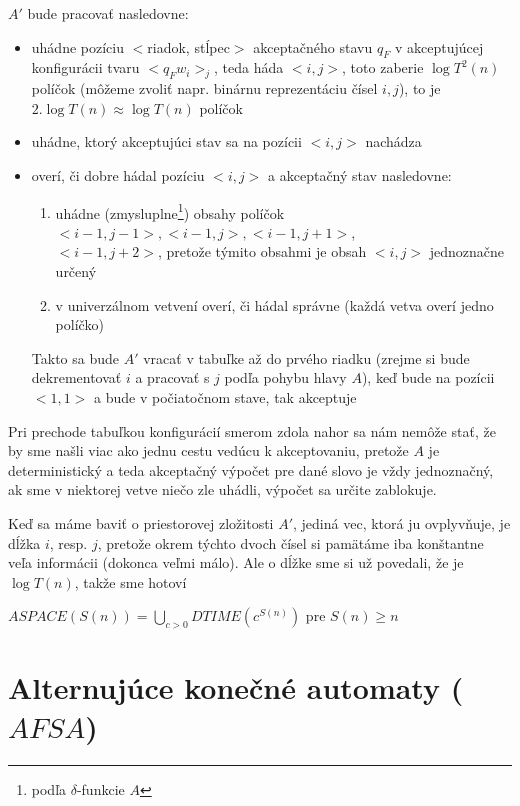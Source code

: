 \begin{dokaz}
  $A'$ bude pracovať nasledovne:
  \begin{itemize}
    \item uhádne pozíciu $<$riadok, stĺpec$>$ akceptačného stavu $q_F$
      v akceptujúcej kon\-fi\-gu\-rá\-cii tvaru \mbox{$<q_Fw_i>_j$},
      teda háda $<i,j>$, toto zaberie $\log T^2(n)$ políčok (môžeme
      zvoliť napr. binárnu reprezentáciu čísel $i,j$), to je $2.\log
      T(n)\approx\log T(n)$ políčok
    \item uhádne, ktorý akceptujúci stav sa na pozícii $<i,j>$
      nachádza
    \item overí, či dobre hádal pozíciu $<i,j>$ a akceptačný stav
      nasledovne:
      \begin{enumerate}
        \item uhádne (zmysluplne\footnote{podľa $\delta$-funkcie $A$})
          obsahy políčok
          \mbox{$<i-1,j-1>,<i-1,j>,<i-1,j+1>$},\\\mbox{$<i-1,j+2>$}, pretože
          týmito obsahmi je obsah $<i,j>$ jednoznačne určený
        \item v univerzálnom vetvení overí, či hádal správne (každá
          vetva overí jedno políčko)
      \end{enumerate}
      Takto sa bude $A'$ vracať v tabuľke až do prvého riadku (zrejme si
      bude dekrementovať $i$ a pracovať s $j$ podľa pohybu hlavy $A$),
      keď bude na pozícii $<1,1>$ a bude v počiatočnom stave, tak
      akceptuje
  \end{itemize}
  Pri prechode tabuľkou konfigurácií smerom zdola nahor sa nám
  nemôže stať, že by sme našli viac ako jednu cestu vedúcu k
  akceptovaniu, pretože $A$ je deterministický a teda akceptačný
  výpočet pre dané slovo je vždy jednoznačný, ak sme v niektorej
  vetve niečo zle uhádli, výpočet sa určite zablokuje.

  \smallskip
  Keď sa máme baviť o priestorovej zložitosti $A'$, jediná vec,
  ktorá ju ovplyvňuje, je dĺžka $i$, resp. $j$, pretože okrem týchto
  dvoch čísel si pamätáme iba konštantne veľa informácii (dokonca
  veľmi málo). Ale o dĺžke sme si už povedali, že je $\log T(n)$,
  takže sme hotoví
\end{dokaz}

\begin{dosledok}
  $ASPACE(S(n))=\underset{{c>0}}{\bigcup}DTIME(c^{S(n)})$ pre
  $S(n)\geq n$
\end{dosledok}

\section{Alternujúce konečné automaty ($AFSA$)}

